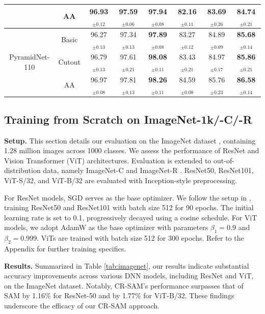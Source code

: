 \documentclass[letterpaper]{article} %
\theoremstyle{plain}
\theoremstyle{definition}
\begin{document}
\begin{table}[h]
{\begin{tabular}{c|c|ccc|ccc}
        & AA & 96.93$_{\pm 0.12}$   & 97.59$_{\pm 0.06}$ & \textbf{97.94}$_{\pm 0.08}$ & 82.16$_{\pm 0.11}$  & 83.69$_{\pm 0.26}$ & \textbf{84.74}$_{\pm 0.21}$ \\
        \midrule
        & Basic & 96.27$_{\pm 0.13}$  & 97.34$_{\pm 0.13}$ & \textbf{97.89}$_{\pm 0.08}$ & 83.27$_{\pm 0.12}$  & 84.89$_{\pm 0.09}$ & \textbf{85.68}$_{\pm 0.14}$ \\
        PyramidNet-110 & Cutout & 96.79$_{\pm 0.13}$  & 97.61$_{\pm 0.21}$ & \textbf{98.08}$_{\pm 0.11}$ & 83.43$_{\pm 0.21}$  & 84.97$_{\pm 0.17}$ & \textbf{85.86}$_{\pm 0.21}$ \\
        & AA & 96.97$_{\pm 0.08}$  & 97.81$_{\pm 0.13}$ & \textbf{98.26}$_{\pm 0.11}$ & 84.59$_{\pm 0.08}$  & 85.76$_{\pm 0.23}$ & \textbf{86.58}$_{\pm 0.14}$ \\
        \bottomrule
    \end{tabular}}
    \label{tab:cifar}
    \vspace{-0.3cm}
\end{table}


\subsection{Training from Scratch on ImageNet-1k/-C/-R}
\label{subsec:imagenet}

\textbf{Setup.} 
This section details our evaluation on the ImageNet dataset \cite{deng2009imagenet}, containing 1.28 million images across 1000 classes. We assess the performance of ResNet \cite{he2016deep} and Vision Transformer (ViT) \cite{dosovitskiy2020image} architectures. Evaluation is extended to out-of-distribution data, namely ImageNet-C \cite{hendrycks2018benchmarking} and ImageNet-R \cite{hendrycks2021many}. ResNet50, ResNet101, ViT-S/32, and ViT-B/32 are evaluated with Inception-style preprocessing.

For ResNet models, SGD serves as the base optimizer. We follow the setup in \cite{du2022efficient}, training ResNet50 and ResNet101 with batch size 512 for 90 epochs. The initial learning rate is set to 0.1, progressively decayed using a cosine schedule. For ViT models, we adopt AdamW \cite{loshchilov2018decoupled} as the base optimizer with parameters $\beta_1=0.9$ and $\beta_2=0.999$. ViTs are trained with batch size 512 for 300 epochs. Refer to the Appendix for further training specifics.

\textbf{Results.}
Summarized in Table \ref{tab:imagenet}, our results indicate substantial accuracy improvements across various DNN models, including ResNet and ViT, on the ImageNet dataset. Notably, CR-SAM's performance surpasses that of SAM by 1.16\% for ResNet-50 and by 1.77\% for ViT-B/32. These findings underscore the efficacy of our CR-SAM approach.
\end{document}
